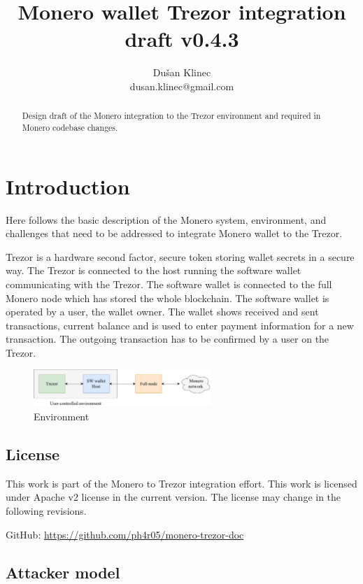 \documentclass[]{article}
\title{Monero wallet Trezor integration draft v0.4.3}
\author{Du\v{s}an Klinec \\{dusan.klinec@gmail.com}}
\begin{document}
	
\maketitle

\begin{abstract}
	Design draft of the Monero integration to the Trezor environment and required in Monero codebase changes.
\end{abstract}

\section{Introduction}
Here follows the basic description of the Monero system, environment, and challenges that need to be addressed to integrate Monero wallet to the Trezor.

Trezor is a hardware second factor, secure token storing wallet secrets in a secure way. 
The Trezor is connected to the host running the software wallet communicating with the Trezor. The software wallet is connected to the full Monero node which has stored the whole blockchain. The software wallet is operated by a user, the wallet owner. The wallet shows received and sent transactions, current balance and is used to enter payment information for a new transaction. The outgoing transaction has to be confirmed by a user on the Trezor.

\begin{figure}[h]
	\centering
	\includegraphics[width=0.6\textwidth, angle=0]{img/trezord.pdf}
	\caption{Environment}
\end{figure}


\subsection{License}
This work is part of the Monero to Trezor integration effort. This work is licensed under Apache v2 license in the current version. The license may change in the following revisions.

GitHub: \url{https://github.com/ph4r05/monero-trezor-doc} 

\subsection{Attacker model}
\end{document}
